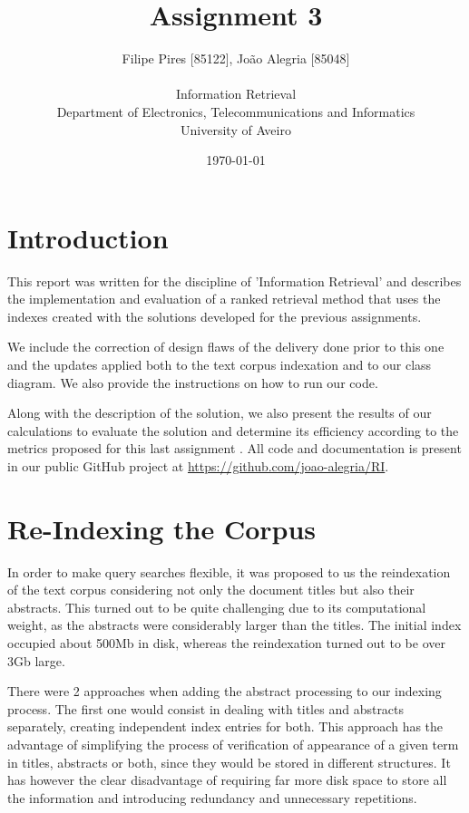 \documentclass[12pt]{article}
\title{Assignment 3}
\author
{Filipe Pires [85122], João Alegria [85048]\\
\\
Information Retrieval\\
\normalsize{Department of Electronics, Telecommunications and Informatics}\\
\normalsize{University of Aveiro}\\
}
\date{\today{}}
\begin{document}
 
\baselineskip18pt
\maketitle 

\section{Introduction}

This report was written for the discipline of 'Information Retrieval' and 
describes the implementation and evaluation of a ranked retrieval method that 
uses the indexes created with the solutions developed for the previous assignments.

We include the correction of design flaws of the delivery done prior to this one
and the updates applied both to the text corpus indexation and to our class diagram.
We also provide the instructions on how to run our code.

Along with the description of the solution, we also present the results of our
calculations to evaluate the solution and determine its efficiency according to 
the metrics proposed for this last assignment \cite{assign3}.
All code and documentation is present in our public GitHub project at 
\url{https://github.com/joao-alegria/RI}. 

\newpage
\section{Re-Indexing the Corpus}

In order to make query searches flexible, it was proposed to us the reindexation
of the text corpus considering not only the document titles but also their abstracts.
This turned out to be quite challenging due to its computational weight, as 
the abstracts were considerably larger than the titles.
The initial index occupied about 500Mb in disk, whereas the reindexation turned
out to be over 3Gb large.

There were 2 approaches when adding the abstract processing to our indexing process. 
The first one would consist in dealing with titles and abstracts separately,
creating independent index entries for both. 
This approach has the advantage of simplifying the process of verification of 
appearance of a given term in titles, abstracts or both, since they would be 
stored in different structures.
It has however the clear disadvantage of requiring far more disk space to store
all the information and introducing redundancy and unnecessary repetitions.
\end{document}
